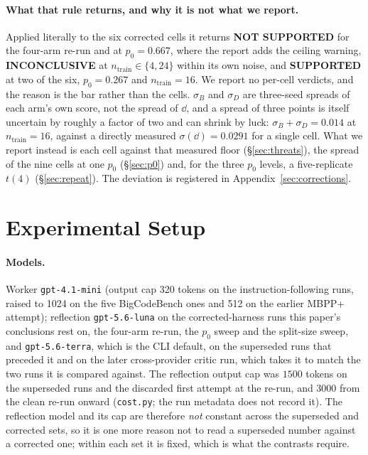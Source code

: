 \documentclass[11pt]{article}
\begin{document}
\paragraph{What that rule returns, and why it is not what we report.} Applied literally to the
six corrected cells it returns \textbf{NOT SUPPORTED} for the four-arm re-run and at
$p_0 = 0.667$, where the report adds the ceiling warning, \textbf{INCONCLUSIVE} at
$n_{\mathrm{train}} \in \{4, 24\}$ within its own noise, and \textbf{SUPPORTED} at two of the
six, $p_0 = 0.267$ and $n_{\mathrm{train}} = 16$. We report no per-cell verdicts, and the
reason is the bar rather than the cells. $\sigma_B$ and $\sigma_D$ are three-seed spreads of each
arm's own score, not the spread of $\dd$, and a spread of three points is itself uncertain by
roughly a factor of two and can shrink by luck:
$\sigma_B + \sigma_D = 0.014$ at $n_{\mathrm{train}} = 16$, against a directly measured
$\sigma(\dd) = 0.0291$ for a single cell. What we report instead is each cell against that
measured floor (\S\ref{sec:threats}), the spread of the nine cells at one $p_0$
(\S\ref{sec:p0}) and, for the three $p_0$ levels, a five-replicate $t(4)$ (\S\ref{sec:repeat}). The deviation is registered in
Appendix~\ref{sec:corrections}.

\section{Experimental Setup}
\label{sec:setup}

\paragraph{Models.} Worker \texttt{gpt-4.1-mini} (output cap 320 tokens on the
instruction-following runs, raised to 1024 on the five BigCodeBench ones and 512 on the earlier
MBPP+ attempt); reflection
\texttt{gpt-5.6-luna} on the corrected-harness runs this paper's conclusions rest on, the
four-arm re-run, the $p_0$ sweep and the split-size sweep, and \texttt{gpt-5.6-terra}, which is
the CLI default, on the superseded runs that preceded it and on the later cross-provider critic
run, which takes it to match the two runs it is compared against. The reflection output cap was
$1500$ tokens on the superseded runs and the discarded first attempt at the re-run, and $3000$
from the clean re-run onward (\texttt{cost.py}; the run metadata does not record it). The
reflection model and its cap are therefore \emph{not} constant across the superseded and
corrected sets, so
it is one more reason not to read a superseded number against a corrected one; within each set
it is fixed, which is what the contrasts require.
\end{document}
